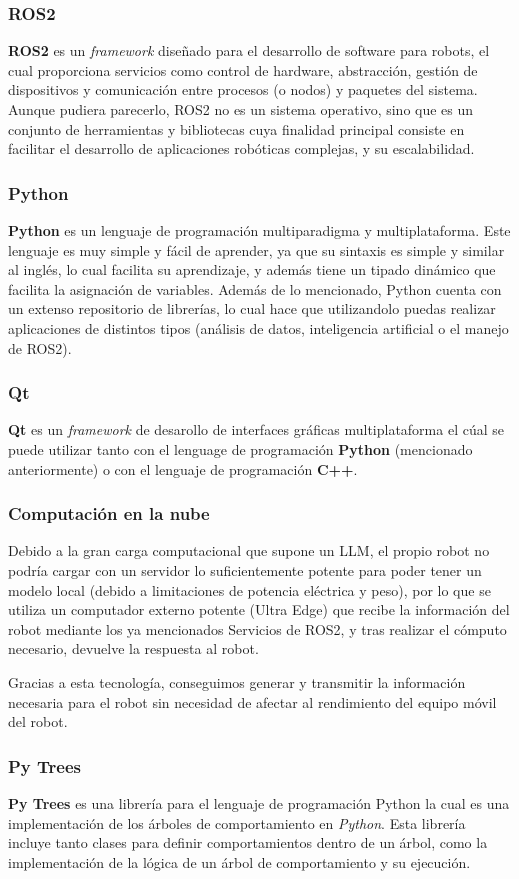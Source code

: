 \documentclass[../main.tex]{subfiles}
\begin{document}
\subsubsection{ROS2}
\textbf{ROS2} es un \textit{framework} diseñado para el desarrollo de software para robots, el cual proporciona servicios como control de hardware,
abstracción, gestión de dispositivos y comunicación entre procesos (o nodos) y paquetes del sistema. Aunque pudiera parecerlo, ROS2 no es un sistema operativo, sino 
que es un conjunto de herramientas y bibliotecas cuya finalidad principal consiste en facilitar el desarrollo de aplicaciones robóticas complejas,
y su escalabilidad.

\subsubsection{Python}
\textbf{Python} es un lenguaje de programación multiparadigma y multiplataforma. Este lenguaje es muy simple y fácil de aprender, ya que su 
sintaxis es simple y similar al inglés, lo cual facilita su aprendizaje, y además tiene un tipado dinámico que facilita la asignación de variables. Además de 
lo mencionado, Python cuenta con un extenso repositorio de librerías, lo cual hace que utilizandolo puedas realizar aplicaciones de distintos tipos (análisis de datos, inteligencia artificial o el
manejo de ROS2).

\subsubsection{Qt}
\textbf{Qt} es un \textit{framework} de desarollo de interfaces gráficas multiplataforma el cúal se puede utilizar tanto con el lenguage de programación \textbf{Python} (mencionado anteriormente) o
con el lenguaje de programación \textbf{C++}.

\subsubsection{Computación en la nube}
Debido a la gran carga computacional que supone un LLM, el propio robot no podría cargar con un servidor lo suficientemente potente para poder tener un modelo local (debido a limitaciones de potencia eléctrica y peso), por lo que se utiliza un computador externo potente (Ultra Edge) que recibe la información del robot mediante los ya mencionados Servicios de ROS2, y tras realizar el cómputo necesario, devuelve la respuesta al robot.

Gracias a esta tecnología, conseguimos generar y transmitir la información necesaria para el robot sin necesidad de afectar al rendimiento del equipo móvil del robot.

\subsubsection{Py Trees}
\textbf{Py Trees} es una librería para el lenguaje de programación Python la cual es una implementación de los árboles de comportamiento en \textit{Python}. Esta librería
incluye tanto clases para definir comportamientos dentro de un árbol, como la implementación de la lógica de un árbol de comportamiento y su ejecución.
\end{document}
